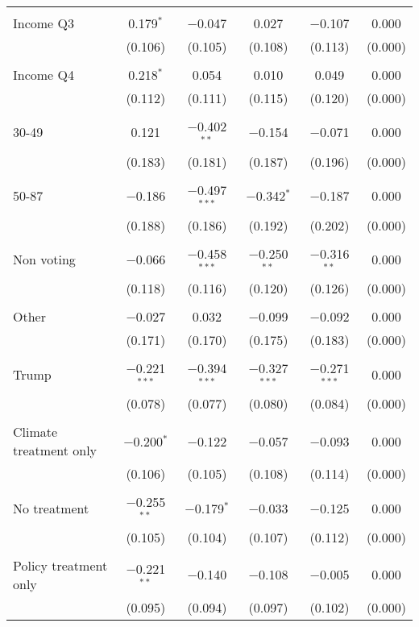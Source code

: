 \begin{tabular}{@{\extracolsep{5pt}}lccccc}
  & & & & & \\ 
 Income Q3 & 0.179$^{*}$ & $-$0.047 & 0.027 & $-$0.107 & 0.000 \\ 
  & (0.106) & (0.105) & (0.108) & (0.113) & (0.000) \\ 
  & & & & & \\ 
 Income Q4 & 0.218$^{*}$ & 0.054 & 0.010 & 0.049 & 0.000 \\ 
  & (0.112) & (0.111) & (0.115) & (0.120) & (0.000) \\ 
  & & & & & \\ 
 30-49 & 0.121 & $-$0.402$^{**}$ & $-$0.154 & $-$0.071 & 0.000 \\ 
  & (0.183) & (0.181) & (0.187) & (0.196) & (0.000) \\ 
  & & & & & \\ 
 50-87 & $-$0.186 & $-$0.497$^{***}$ & $-$0.342$^{*}$ & $-$0.187 & 0.000 \\ 
  & (0.188) & (0.186) & (0.192) & (0.202) & (0.000) \\ 
  & & & & & \\ 
 Non voting & $-$0.066 & $-$0.458$^{***}$ & $-$0.250$^{**}$ & $-$0.316$^{**}$ & 0.000 \\ 
  & (0.118) & (0.116) & (0.120) & (0.126) & (0.000) \\ 
  & & & & & \\ 
 Other & $-$0.027 & 0.032 & $-$0.099 & $-$0.092 & 0.000 \\ 
  & (0.171) & (0.170) & (0.175) & (0.183) & (0.000) \\ 
  & & & & & \\ 
 Trump & $-$0.221$^{***}$ & $-$0.394$^{***}$ & $-$0.327$^{***}$ & $-$0.271$^{***}$ & 0.000 \\ 
  & (0.078) & (0.077) & (0.080) & (0.084) & (0.000) \\ 
  & & & & & \\ 
 Climate treatment only & $-$0.200$^{*}$ & $-$0.122 & $-$0.057 & $-$0.093 & 0.000 \\ 
  & (0.106) & (0.105) & (0.108) & (0.114) & (0.000) \\ 
  & & & & & \\ 
 No treatment & $-$0.255$^{**}$ & $-$0.179$^{*}$ & $-$0.033 & $-$0.125 & 0.000 \\ 
  & (0.105) & (0.104) & (0.107) & (0.112) & (0.000) \\ 
  & & & & & \\ 
 Policy treatment only & $-$0.221$^{**}$ & $-$0.140 & $-$0.108 & $-$0.005 & 0.000 \\ 
  & (0.095) & (0.094) & (0.097) & (0.102) & (0.000) \\ 

\end{tabular}
